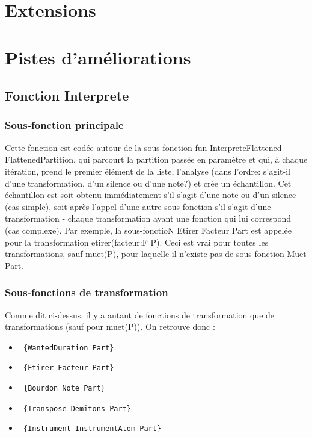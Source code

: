 \documentclass[12pt,a4paper]{article}
\begin{document}
\section{Extensions}
\section{Pistes d'améliorations}


\newpage



\subsection{Fonction Interprete}
\subsubsection{Sous-fonction principale}
Cette fonction est codée autour de la sous-fonction fun {InterpreteFlattened FlattenedPartition},
 qui parcourt la partition passée en paramètre et qui, à chaque itération, prend le premier
élément de la liste, l'analyse (dans l'ordre: s'agit-il d'une transformation, d'un silence ou d'une note?)
 et crée un échantillon. Cet échantillon est soit obtenu immédiatement s'il s'agit d'une note ou d'un
silence (cas simple), soit après l'appel d'une autre sous-fonction s'il s'agit d'une transformation -
chaque transformation ayant une fonction qui lui correspond (cas complexe). Par exemple, la sous-fonctioN
{Etirer Facteur Part} est appelée pour la transformation etirer(facteur:F P). Ceci est vrai pour toutes
les transformations, sauf muet(P), pour laquelle il n'existe pas de sous-fonction {Muet Part}.

\subsubsection{Sous-fonctions de transformation}
Comme dit ci-dessus, il y a autant de fonctions de transformation que de transformations (sauf pour muet(P)). 
On retrouve donc :
\begin{itemize}
	\item \begin{verbatim} {WantedDuration Part} \end{verbatim}
	\item \begin{verbatim} {Etirer Facteur Part} \end{verbatim}
	\item \begin{verbatim} {Bourdon Note Part} \end{verbatim}
	\item \begin{verbatim} {Transpose Demitons Part} \end{verbatim}
	\item \begin{verbatim} {Instrument InstrumentAtom Part} \end{verbatim} 
\end{itemize}
\end{document}
